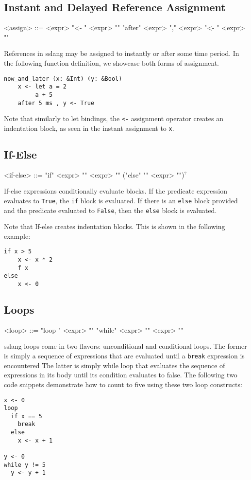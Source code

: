 \documentclass{article}
\begin{document}
\subsection{Instant and Delayed Reference Assignment}
\begin{grammar}
<assign> ::= <expr> "<- {" <expr> "}"
\alt "after" <expr> "," <expr> "<- {" <expr> "}"
\end{grammar}
References in sslang may be assigned to instantly or after some time period. In the following function definition, we showcase both forms of assignment.
\begin{lstlisting}
now_and_later (x: &Int) (y: &Bool)
    x <- let a = 2
         a + 5
    after 5 ms , y <- True
\end{lstlisting}
Note that similarly to let bindings, the \texttt{<-} assignment operator creates an indentation block, as seen in the instant assignment to \texttt{x}.
\subsection{If-Else}
\begin{grammar}
<if-else> ::= "if" <expr> "{" <expr> "}" ("else" "{" <expr> "}")$^{?}$
\end{grammar}
If-else expressions conditionally evaluate blocks. If the predicate expression evaluates to \texttt{True}, the \texttt{if} block is evaluated. If there is an \texttt{else} block provided and the predicate evaluated to \texttt{False}, then the \texttt{else} block is evaluated.

Note that If-else creates indentation blocks. This is shown in the following example:
\begin{lstlisting}
if x > 5
    x <- x * 2
    f x
else
    x <- 0
\end{lstlisting}
\subsection{Loops}
\begin{grammar}
<loop> ::= "loop {" <expr> "}"
\alt "while" <expr> "{" <expr> "}"
\end{grammar}
sslang loops come in two flavors: unconditional and conditional loops. The former is simply a sequence of expressions that are evaluated until a \texttt{break} expression is encountered The latter is simply while loop that evaluates the sequence of expressions in its body until its condition evaluates to false. The following two code snippets demonstrate how to count to five using these two loop constructs:
\begin{lstlisting}
x <- 0
loop
  if x == 5
    break
  else 
    x <- x + 1
    
y <- 0
while y != 5
  y <- y + 1
 
\end{lstlisting}
\end{document}
